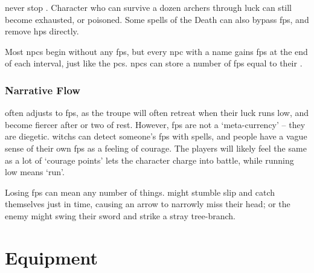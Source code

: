 \begin{multicols}{2}
\noindent
{} never stop .
Character who can survive a dozen archers through luck can still become exhausted, or poisoned.
Some spells of the Death  can also bypass \glspl{fp}, and remove \glspl{hp} directly.

Most \glspl{npc} begin without any \glspl{fp}, but every \gls{npc} with a name gains \glspl{fp} at the end of each \gls{interval}, just like the \glspl{pc}.
\Glspl{npc} can store a number of \glspl{fp} equal to their .

\subsubsection{Narrative Flow}
often adjusts to \glspl{fp}, as the troupe will often retreat when their luck runs low, and become fiercer after  or two of rest.
However, \glspl{fp} are not a `meta-currency' -- they are diegetic.
\Glspl{witch} can detect someone's \glspl{fp} with \glspl{spell}, and people have a vague sense of their own \glspl{fp} as a feeling of courage.
The players will likely feel the same as a lot of `courage points' lets the character charge into battle, while running low means `run'.

Losing \glspl{fp} can mean any number of things.
 might stumble slip and catch themselves just in time, causing an arrow to narrowly miss their head; or the enemy might swing their sword and strike a stray tree-branch.

\end{multicols}


\section{Equipment}

